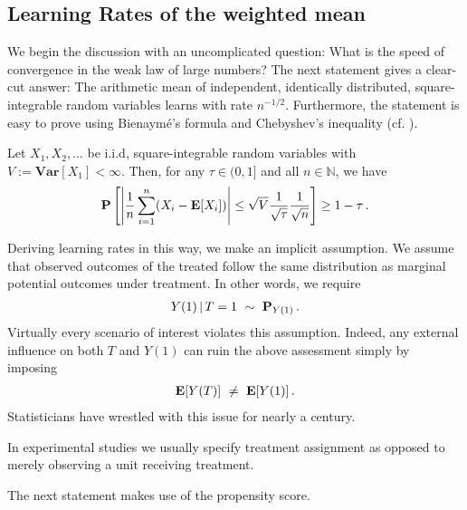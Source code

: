 

\subsection{Learning Rates of the weighted mean}

We begin the discussion with an
uncomplicated question:
What is the speed of convergence in the weak law of large numbers?
The next statement gives a clear-cut answer:
The arithmetic mean of independent, identically distributed, square-integrable random variables 
learns with rate $n^{-1/2}$.
Furthermore, the statement is easy to prove using
Bienaymé's formula and Chebyshev's inequality (cf. \cite[Theorem~5.14]{Klenke2020}).


\begin{theorem*}
  Let 
  $
    X_1,X_2,\ldots
  $
  be i.i.d, square-integrable random variables with 
  $
    V:=
    \mathbf{Var}[X_1]
    <\infty
  $.
  Then, for any $\tau \in (0,1]$ and all $n\in\mathbb{N}$, we have
  \begin{gather}
   \mathbf{P}
   \left[
     \left| 
   \frac{1}{n}
   \sum_{i=1}^{n}
   (X_i - \mathbf{E}[X_i])
     \right|
     \le
     \sqrt{V}
     \frac{1}{\sqrt{\tau}}
     \frac{1}{\sqrt{n}}
   \right]
   \ge
   1-\tau\,.
  \end{gather}
\end{theorem*}

Deriving learning rates in this way, we make an implicit assumption.
We assume that
observed outcomes of the treated follow the same distribution as
marginal potential outcomes under treatment.
In other words, we require
\begin{gather}
  Y(1)\,|\,T=1
  \ 
  \sim 
  \ 
  \P_
  {
  Y(1)
  }
  \,.
\end{gather}
Virtually every scenario of interest violates this assumption.
Indeed, any external influence on both $T$ and $Y(1)$ can ruin the 
above assessment simply by imposing 
\begin{gather}
  \mathbf{E}[Y(T)]\ \neq\  \mathbf{E}[Y(1)]
  \,.
\end{gather}
Statisticians have wrestled with this issue for nearly a century.

In experimental studies we usually specify treatment assignment as opposed to merely observing a unit receiving treatment. 

The next statement makes use of the propensity score.

